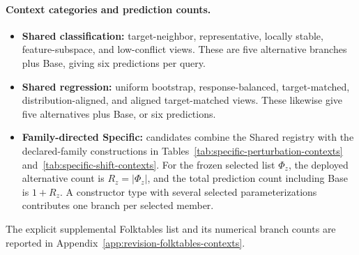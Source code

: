 \paragraph{Context categories and prediction counts.}
\label{app:context-category-counts}
\begingroup\color{revisionblue}
\begin{itemize}
  \item \textbf{Shared classification:} target-neighbor, representative,
  locally stable, feature-subspace, and low-conflict views. These are five
  alternative branches plus Base, giving six predictions per query.
  \item \textbf{Shared regression:} uniform bootstrap, response-balanced,
  target-matched, distribution-aligned, and aligned target-matched views.
  These likewise give five alternatives plus Base, or six predictions.
  \item \textbf{Family-directed Specific:} candidates combine the Shared
  registry with the declared-family constructions in
  Tables~\ref{tab:specific-perturbation-contexts}
  and~\ref{tab:specific-shift-contexts}. For the frozen selected list
  $\Phi_z$, the deployed alternative count is $R_z=|\Phi_z|$, and the total
  prediction count including Base is $1+R_z$. A constructor type with several
  selected parameterizations contributes one branch per selected member.
\end{itemize}
The explicit supplemental Folktables list and its numerical branch counts are
reported in Appendix~\ref{app:revision-folktables-contexts}.
\endgroup

